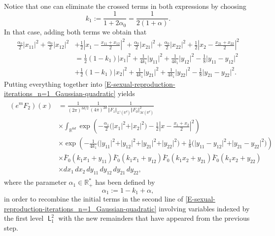 \documentclass[reqno]{amsart}
\DeclareMathOperator{\Level}{\mathsf{L}}
\numberwithin{equation}{section}
\begin{document}
{\begin{align*}
\end{align*}
Notice that one can eliminate the crossed terms in both expressions by choosing
$$k_1:=\frac{1}{1+2\alpha_0}=\frac{1}{2(1+\alpha)}.$$
In that case, adding both terms we obtain that
\begin{align*}
\frac{\alpha_0}{2}\vert x_{11}\vert^2+\frac{\alpha_0}{2}\vert x_{12}\vert^2&+\frac{1}{2}\left\vert x_1-\frac{x_{11}+x_{12}}{2}\right\vert^2+\frac{\alpha_0}{2}\vert x_{21}\vert^2+\frac{\alpha_0}{2}\vert x_{22}\vert^2+\frac{1}{2}\left\vert x_2-\frac{x_{21}+x_{22}}{2}\right\vert^2\\
&=\frac{1}{2}(1-k_1)\vert x_1\vert^2+\frac{1}{4 k_1}\vert y_{11}\vert^2+\frac{1}{4 k_1}\vert y_{12}\vert^2-\frac{1}{8}\vert y_{11}-y_{12}\vert^2\\
&+\frac{1}{2}(1-k_1)\vert x_2\vert^2+\frac{1}{4 k_1}\vert y_{21}\vert^2+\frac{1}{4 k_1}\vert y_{22}\vert^2-\frac{1}{8}\vert y_{21}-y_{22}\vert^2.
\end{align*}
Putting everything together into \eqref{E-sexual-reproduction-iterations_n=1_Gaussian-quadratic} yields
\begin{align}\label{E-sexual-reproduction-iterations_n=1_Gaussian-quadratic-change-1}
\begin{aligned}
(e^{m}F_2)(x)&=\frac{1}{(2\pi)^{3d/2}}\frac{1}{(4\pi)^{2d}}\frac{1}{\Vert F_1\Vert_{L^1(\mathbb{R}^d)}\Vert F_0\Vert_{\mathcal{M}(\mathbb{R}^d)}^2}\\
&\times \int_{\mathbb{R}^{6d}} \exp\left(-\frac{\alpha_1}{2}\big(\vert x_1\vert^2+\vert x_2\vert^2\big)-\frac{1}{2}\left\vert x-\frac{x_1+x_2}{2}\right\vert^2\right)\\
&\times \exp\left(-\frac{1}{4 k_1}\big(\vert y_{11}\vert^2+\vert y_{12}\vert^2+\vert y_{21}\vert^2+\vert y_{22}\vert^2\big)+\frac{1}{8}\big(\vert y_{11}-y_{12}\vert^2+\vert y_{21}-y_{22}\vert^2\big)\right)\\
&\times \bar{F}_0(k_1x_1+y_{11})\bar{F}_0(k_1x_1+y_{12})\bar{F}_0(k_1x_2+y_{21})\bar{F}_0(k_1x_2+y_{22})\\
&\times dx_1\,dx_2\,dy_{11}\,dy_{12}\,dy_{21}\,dy_{22},
\end{aligned}
\end{align}
where the parameter $\alpha_1\in \mathbb{R}_+^*$ has been defined by
$$\alpha_1:=1-k_1+\alpha,$$
in order to recombine the initial terms in the second line of \eqref{E-sexual-reproduction-iterations_n=1_Gaussian-quadratic} involving variables indexed by the first level $\Level_1^2$ with the new remainders that have appeared from the previous step.

}
\end{document}
